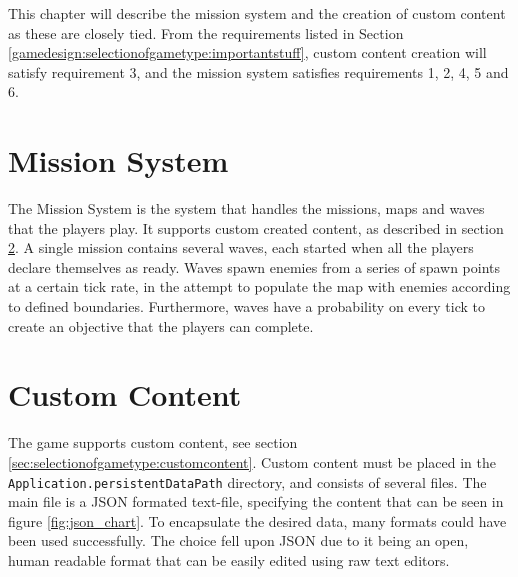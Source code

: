 This chapter will describe the mission system and the creation of custom content as these are closely tied.
From the requirements listed in Section \ref{gamedesign:selectionofgametype:importantstuff}, custom content creation will satisfy requirement 3, and the mission system satisfies requirements 1, 2, 4, 5 and 6.

\section{Mission System}

The Mission System is the system that handles the missions, maps and waves that the players play.
It supports custom created content, as described in section \ref{sec:modules:missions:customcontent}.
A single mission contains several waves, each started when all the players declare themselves as ready.
Waves spawn enemies from a series of spawn points at a certain tick rate, in the attempt to populate the map with enemies according to defined boundaries.
Furthermore, waves have a probability on every tick to create an objective that the players can complete.

\section{Custom Content}\label{sec:modules:missions:customcontent}

The game supports custom content, see section \ref{sec:selectionofgametype:customcontent}.
Custom content must be placed in the \lstinline|Application.persistentDataPath| directory, and consists of several files.
The main file is a JSON formated text-file, specifying the content that can be seen in figure \ref{fig:json_chart}.
To encapsulate the desired data, many formats could have been used successfully.
The choice fell upon JSON due to it being an open, human readable format that can be easily edited using raw text editors.

